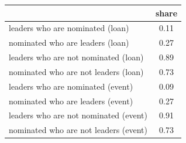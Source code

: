 {
\def\sym#1{\ifmmode^{#1}\else\(^{#1}\)\fi}
\begin{tabular}{@{\hskip\tabcolsep\extracolsep\fill}l*{1}{c}}
\hline\hline
                                                                                                    &       share\\
\hline
leaders who are nominated (loan)                                                                    &        0.11\\
nominated who are leaders (loan)                                                                    &        0.27\\
leaders who are not nominated (loan)                                                                &        0.89\\
nominated who are not leaders (loan)                                                                &        0.73\\
leaders who are nominated (event)                                                                   &        0.09\\
nominated who are leaders (event)                                                                   &        0.27\\
leaders who are not nominated (event)                                                               &        0.91\\
nominated who are not leaders (event)                                                               &        0.73\\
\hline\hline
\end{tabular}
}
